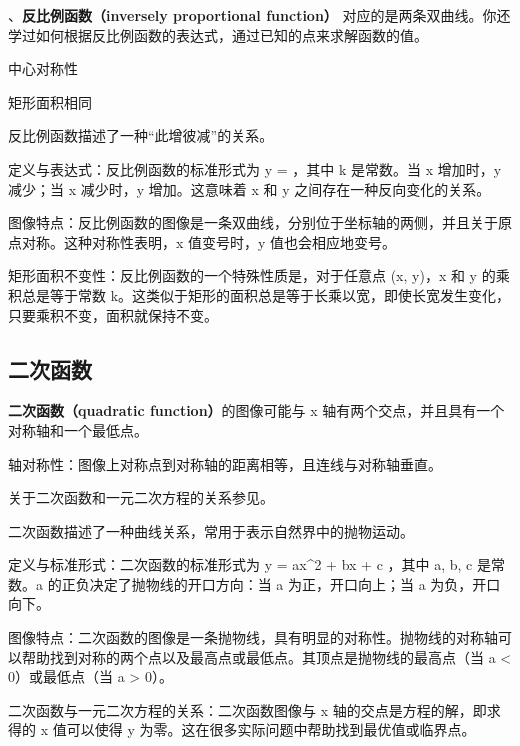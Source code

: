 、\textbf{反比例函数（inversely proportional function）}
对应的是两条双曲线。你还学过如何根据反比例函数的表达式，通过已知的点来求解函数的值。

中心对称性

矩形面积相同

反比例函数描述了一种“此增彼减”的关系。

定义与表达式：反比例函数的标准形式为  y =  ，其中 k 是常数。当 x 增加时，y 减少；当 x 减少时，y 增加。这意味着 x 和 y 之间存在一种反向变化的关系。

图像特点：反比例函数的图像是一条双曲线，分别位于坐标轴的两侧，并且关于原点对称。这种对称性表明，x 值变号时，y 值也会相应地变号。

矩形面积不变性：反比例函数的一个特殊性质是，对于任意点 (x, y)，x 和 y 的乘积总是等于常数 k。这类似于矩形的面积总是等于长乘以宽，即使长宽发生变化，只要乘积不变，面积就保持不变。


\subsection{二次函数}

\textbf{二次函数（quadratic function）}的图像可能与  x  轴有两个交点，并且具有一个对称轴和一个最低点。

轴对称性：图像上对称点到对称轴的距离相等，且连线与对称轴垂直。

关于二次函数和一元二次方程的关系参见。

二次函数描述了一种曲线关系，常用于表示自然界中的抛物运动。

定义与标准形式：二次函数的标准形式为  y = ax^2 + bx + c ，其中 a, b, c 是常数。a 的正负决定了抛物线的开口方向：当 a 为正，开口向上；当 a 为负，开口向下。

图像特点：二次函数的图像是一条抛物线，具有明显的对称性。抛物线的对称轴可以帮助找到对称的两个点以及最高点或最低点。其顶点是抛物线的最高点（当 a < 0）或最低点（当 a > 0）。

二次函数与一元二次方程的关系：二次函数图像与 x 轴的交点是方程的解，即求得的 x 值可以使得 y 为零。这在很多实际问题中帮助找到最优值或临界点。
